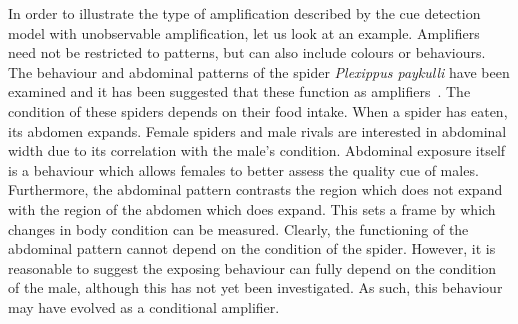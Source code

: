 \documentclass[a4paper,12pt]{article}
\numberwithin{equation}{section}
\numberwithin{figure}{section}
\begin{document}
In order to illustrate the type of amplification described by the cue detection model with unobservable amplification, let us look at an example. Amplifiers need not be restricted to patterns, but can also include colours or behaviours. The behaviour and abdominal patterns of the spider \textit{Plexippus paykulli} have been examined and it has been suggested that these function as amplifiers~\cite{Taylor2000}. The condition of these spiders depends on their food intake. When a spider has eaten, its abdomen expands. Female spiders and male rivals are interested in abdominal width due to its correlation with the male's condition. Abdominal exposure itself is a behaviour which allows females to better assess the quality cue of males. Furthermore, the abdominal pattern contrasts the region which does not expand with the region of the abdomen which does expand. This sets a frame by which changes in body condition can be measured. Clearly, the functioning of the abdominal pattern cannot depend on the condition of the spider. However, it is reasonable to suggest the exposing behaviour can fully depend on the condition of the male, although this has not yet been investigated. As such, this behaviour may have evolved as a conditional amplifier.
\end{document}
